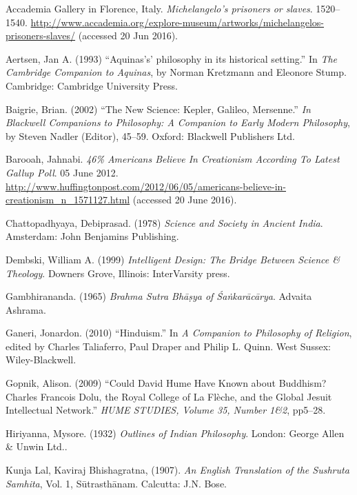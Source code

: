 \begin{thebibliography}{99}
\itemsep=2pt
Accademia Gallery in Florence, Italy. {\sl Michelangelo's prisoners or slaves}. 1520--1540. \url{http://www.accademia.org/explore-museum/artworks/michelangelos-prisoners-slaves/} (accessed 20 Jun 2016).

Aertsen, Jan A. (1993) ``Aquinas's' philosophy in its historical setting.'' In {\sl The Cambridge Companion to Aquinas}, by Norman Kretzmann and Eleonore Stump. Cambridge: Cambridge University Press.

Baigrie, Brian. (2002) ``The New Science: Kepler, Galileo, Mersenne.'' {\sl In Blackwell Companions to Philosophy: A Companion to Early Modern Philosophy}, by Steven Nadler (Editor), 45--59. Oxford: Blackwell Publishers Ltd.

Barooah, Jahnabi. {\sl 46\% Americans Believe In Creationism According To Latest Gallup Poll}. 05 June 2012. \url{http://www.huffingtonpost.com/2012/06/05/americans-believe-in-creationism_n_1571127.html} (accessed 20 June 2016).

Chattopadhyaya, Debiprasad. (1978) {\sl Science and Society in Ancient India}. Amsterdam: John Benjamins Publishing.

Dembski, William A. (1999) {\sl Intelligent Design: The Bridge Between Science \& Theology}. Downers Grove, Illinois: InterVarsity press.

Gambhirananda. (1965) {\sl Brahma Sutra Bhāṣya of Śaṅkarācārya}. Advaita Ashrama.

Ganeri, Jonardon. (2010) ``Hinduism.'' In {\sl A Companion to Philosophy of Religion}, edited by Charles Taliaferro, Paul Draper and Philip L. Quinn. West Sussex: Wiley-Blackwell.

Gopnik, Alison. (2009) ``Could David Hume Have Known about Buddhism? Charles Francois Dolu, the Royal College of La Flèche, and the Global Jesuit Intellectual Network.'' {\sl HUME STUDIES, Volume 35, Number 1\&2}, pp5--28.

Hiriyanna, Mysore. (1932) {\sl Outlines of Indian Philosophy}. London: George Allen \& Unwin Ltd..

Kunja Lal, Kaviraj Bhishagratna, (1907). {\sl An English Translation of the Sushruta Samhita}, Vol. 1, Sūtrasthānam. Calcutta: J.N. Bose.


\end{thebibliography}
